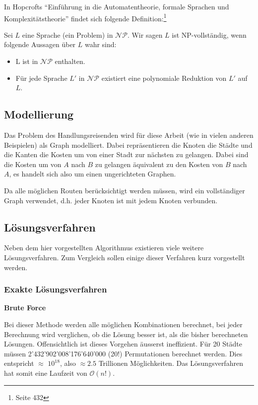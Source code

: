 \documentclass[11pt,a4paper]{article}
\begin{document}
\medskip

In Hopcrofts "`Einführung in die Automatentheorie, formale Sprachen und Komplexitätstheorie"' findet sich folgende Definition:\footnote{\cite{hopcroft02} Seite 432}

Sei $L$ eine Sprache (ein Problem) in $\mathcal{NP}$. Wir sagen $L$ ist NP-vollständig, wenn folgende Aussagen über $L$ wahr sind:
\begin{itemize}
    \item L ist in $\mathcal{NP}$ enthalten.
    \item Für jede Sprache $L'$ in $\mathcal{NP}$ existiert eine polynomiale Reduktion von $L'$ auf $L$.
\end{itemize}

\subsection{Modellierung}
Das Problem des Handlungsreisenden wird für diese Arbeit (wie in vielen anderen Beispielen) als Graph modelliert. Dabei repräsentieren die Knoten die Städte und die Kanten die Kosten um von einer Stadt zur nächsten zu gelangen. Dabei sind die Kosten um von $A$ nach $B$ zu gelangen äquivalent zu den Kosten von $B$ nach $A$, es handelt sich also um einen ungerichteten Graphen.

Da alle möglichen Routen berücksichtigt werden müssen, wird ein vollständiger Graph verwendet, d.h. jeder Knoten ist mit jedem Knoten verbunden.

\subsection{Lösungsverfahren}
Neben dem hier vorgestellten Algorithmus existieren viele weitere Lösungsverfahren. Zum Vergleich sollen einige dieser Verfahren kurz vorgestellt werden.

\subsubsection{Exakte Lösungsverfahren}
\begin{flushleft}
\textbf{Brute Force}

Bei dieser Methode werden alle möglichen Kombinationen berechnet, bei jeder Berechnung wird verglichen, ob die Lösung besser ist, als die bisher berechneten Lösungen. Offensichtlich ist dieses Vorgehen äusserst ineffizient. Für 20 Städte müssen 2'432'902'008'176'640'000 (20!) Permutationen berechnet werden. Dies entspricht $\approx$ $10^{18}$, also $\approx2.5$ Trillionen Möglichkeiten. Das Lösungsverfahren hat somit eine Laufzeit von $\mathcal O(n!)$.

\end{flushleft}
\end{document}
